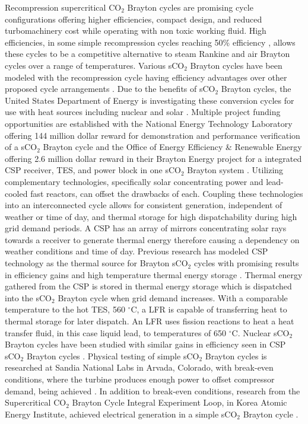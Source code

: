 Recompression supercritical CO$_2$ Brayton cycles are promising cycle configurations offering higher efficiencies, compact design, and reduced turbomachinery cost while operating with non toxic working fluid. High efficiencies, in some simple recompression cycles reaching 50\% efficiency \cite{turchi_2013,wright_2009}, allows these cycles to be a competitive alternative to steam Rankine and air Brayton cycles over a range of temperatures. Various sCO$_2$ Brayton cycles have been modeled with the recompression cycle having efficiency advantages over other proposed cycle arrangements \cite{turchi_2013,ahn_2014,wang_2018}.  Due to the benefits of sCO$_2$ Brayton cycles, the United States Department of Energy is investigating these conversion cycles for use with heat sources including nuclear and solar \cite{doe_2012}. Multiple project funding opportunities are established with the National Energy Technology Laboratory offering 144 million dollar reward for demonstration and performance verification of a sCO$_2$ Brayton cycle \cite{netl_2016} and the Office of Energy Efficiency \& Renewable Energy offering 2.6 million dollar reward in their Brayton Energy project for a integrated CSP receiver, TES, and power block in one sCO$_2$ Brayton system \cite{seto_2015}. Utilizing complementary technologies, specifically solar concentrating power and lead-cooled fast reactors, can offset the drawbacks of each. Coupling these technologies into an interconnected cycle allows for consistent generation, independent of weather or time of day, and thermal storage for high dispatchability during high grid demand periods.
A CSP has an array of mirrors concentrating solar rays towards a receiver to generate thermal energy therefore causing a dependency on weather conditions and time of day. Previous research has modeled CSP technology as the thermal source for Brayton sCO$_2$ cycles with promising results in efficiency gains and high temperature thermal energy storage \cite{turchi_2013, iverson_2013, ho_2015, wang_2018, neises_2020}. Thermal energy gathered from the CSP is stored in thermal energy storage which is dispatched into the sCO$_2$ Brayton cycle when grid demand increases. With a comparable temperature to the hot TES, 560 $^{\circ}$C, a LFR is capable of transferring heat to thermal storage for later dispatch. An LFR uses fission reactions to heat a heat transfer fluid, in this case liquid lead, to temperatures of 650 $^{\circ}$C. Nuclear sCO$_2$ Brayton cycles have been studied with similar gains in efficiency seen in CSP sCO$_2$ Brayton cycles \cite{ dostal_2004, luo_2020}. Physical testing of simple sCO$_2$ Brayton cycles is researched at Sandia National Labs in Arvada, Colorado, with break-even conditions, where the turbine produces enough power to offset compressor demand, being achieved \cite{wright_2011}. In addition to break-even conditions, research from the Supercritical CO$_2$ Brayton Cycle Integral Experiment Loop, in Korea Atomic Energy Institute, achieved electrical generation in a simple sCO$_2$ Brayton cycle \cite{cha_2016}. 


